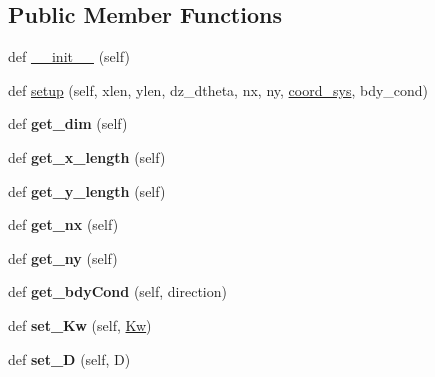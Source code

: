 \subsection*{Public Member Functions}
\begin{DoxyCompactItemize}
\item 
def \hyperlink{classcomp_1_1Comp_a1041d334bd68899c6a0a6c0a1937a34d}{\+\_\+\+\_\+init\+\_\+\+\_\+} (self)
\item 
def \hyperlink{classcomp_1_1Comp_a0aaeedb7d9ff655d5b7cf1f8d0b5cb00}{setup} (self, xlen, ylen, dz\+\_\+dtheta, nx, ny, \hyperlink{classcomp_1_1Comp_ae00e132d485d50acaf13977284fd9051}{coord\+\_\+sys}, bdy\+\_\+cond)
\item 
def {\bfseries get\+\_\+dim} (self)\hypertarget{classcomp_1_1Comp_a194c4491ee3b385837577d7c13ec78a9}{}\label{classcomp_1_1Comp_a194c4491ee3b385837577d7c13ec78a9}

\item 
def {\bfseries get\+\_\+x\+\_\+length} (self)\hypertarget{classcomp_1_1Comp_a68bec52b5d8268a395c7a0bd4f2a0d5f}{}\label{classcomp_1_1Comp_a68bec52b5d8268a395c7a0bd4f2a0d5f}

\item 
def {\bfseries get\+\_\+y\+\_\+length} (self)\hypertarget{classcomp_1_1Comp_aa11dcc4fec99c38897350154d3b9900e}{}\label{classcomp_1_1Comp_aa11dcc4fec99c38897350154d3b9900e}

\item 
def {\bfseries get\+\_\+nx} (self)\hypertarget{classcomp_1_1Comp_a4bc59e92071b7ca507e44d53433a4bf7}{}\label{classcomp_1_1Comp_a4bc59e92071b7ca507e44d53433a4bf7}

\item 
def {\bfseries get\+\_\+ny} (self)\hypertarget{classcomp_1_1Comp_aa9754974a57bbe51a9ed46a0205ae505}{}\label{classcomp_1_1Comp_aa9754974a57bbe51a9ed46a0205ae505}

\item 
def {\bfseries get\+\_\+bdy\+Cond} (self, direction)\hypertarget{classcomp_1_1Comp_a32251f4a77a6fe555508981111c6b451}{}\label{classcomp_1_1Comp_a32251f4a77a6fe555508981111c6b451}

\item 
def {\bfseries set\+\_\+\+Kw} (self, \hyperlink{classcomp_1_1Comp_a1ebc8e2cc35684cf7374e5928b01b18d}{Kw})\hypertarget{classcomp_1_1Comp_a44d846f076c0e3205272492a1dab5f78}{}\label{classcomp_1_1Comp_a44d846f076c0e3205272492a1dab5f78}

\item 
def {\bfseries set\+\_\+D} (self, D)\hypertarget{classcomp_1_1Comp_a75f74fbf919f3241b05e20594cfa3cd3}{}\label{classcomp_1_1Comp_a75f74fbf919f3241b05e20594cfa3cd3}


\end{DoxyCompactItemize}
